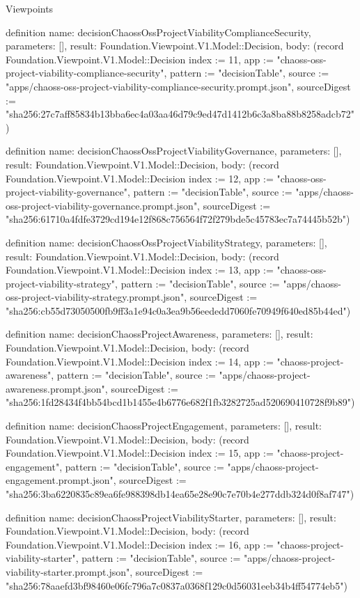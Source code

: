 \begin{lexlean}{Viewpoints}
\begin{semanticmodule}
definition{
  name: decisionChaossOssProjectViabilityComplianceSecurity,
  parameters: [],
  result: Foundation.Viewpoint.V1.Model::Decision,
  body: (record Foundation.Viewpoint.V1.Model::Decision {index := 11, app := "chaoss-oss-project-viability-compliance-security", pattern := "decisionTable", source := "apps/chaoss-oss-project-viability-compliance-security.prompt.json", sourceDigest := "sha256:27c7aff85834b13bba6ec4a03aa46d79c9ed47d1412b6c3a8ba88b8258adcb72"})
}

definition{
  name: decisionChaossOssProjectViabilityGovernance,
  parameters: [],
  result: Foundation.Viewpoint.V1.Model::Decision,
  body: (record Foundation.Viewpoint.V1.Model::Decision {index := 12, app := "chaoss-oss-project-viability-governance", pattern := "decisionTable", source := "apps/chaoss-oss-project-viability-governance.prompt.json", sourceDigest := "sha256:61710a4fdfe3729cd194e12f868c756564f72f279bde5c45783ec7a74445b52b"})
}

definition{
  name: decisionChaossOssProjectViabilityStrategy,
  parameters: [],
  result: Foundation.Viewpoint.V1.Model::Decision,
  body: (record Foundation.Viewpoint.V1.Model::Decision {index := 13, app := "chaoss-oss-project-viability-strategy", pattern := "decisionTable", source := "apps/chaoss-oss-project-viability-strategy.prompt.json", sourceDigest := "sha256:cb55d73050500fb9ff3a1e94c0a3ea9b56eededd7060fe70949f640ed85b44ed"})
}

definition{
  name: decisionChaossProjectAwareness,
  parameters: [],
  result: Foundation.Viewpoint.V1.Model::Decision,
  body: (record Foundation.Viewpoint.V1.Model::Decision {index := 14, app := "chaoss-project-awareness", pattern := "decisionTable", source := "apps/chaoss-project-awareness.prompt.json", sourceDigest := "sha256:1fd28434f4bb54bcd1b1455e4b6776e682f1fb3282725ad520690410728f9b89"})
}

definition{
  name: decisionChaossProjectEngagement,
  parameters: [],
  result: Foundation.Viewpoint.V1.Model::Decision,
  body: (record Foundation.Viewpoint.V1.Model::Decision {index := 15, app := "chaoss-project-engagement", pattern := "decisionTable", source := "apps/chaoss-project-engagement.prompt.json", sourceDigest := "sha256:3ba6220835c89ea6fe988398db14ea65e28e90c7e70b4e277ddb324d0f8af747"})
}

definition{
  name: decisionChaossProjectViabilityStarter,
  parameters: [],
  result: Foundation.Viewpoint.V1.Model::Decision,
  body: (record Foundation.Viewpoint.V1.Model::Decision {index := 16, app := "chaoss-project-viability-starter", pattern := "decisionTable", source := "apps/chaoss-project-viability-starter.prompt.json", sourceDigest := "sha256:78aaefd3bf98460e06fc796a7c0837a0368f129c0d56031eeb34b4ff54774eb5"})
}


\end{semanticmodule}
\end{lexlean}
